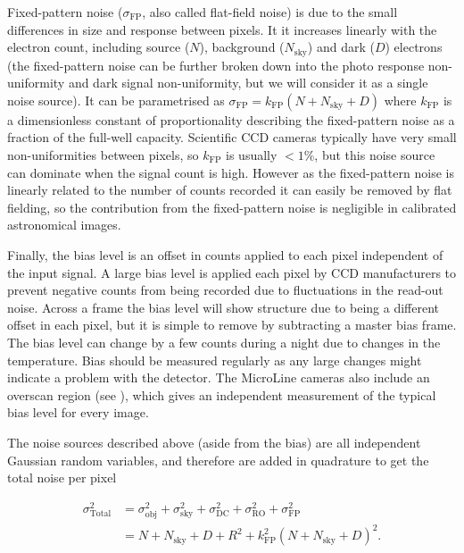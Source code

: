 \begin{colsection}
Fixed-pattern noise ($\sigma_\text{FP}$, also called flat-field noise) is due to the small differences in size and response between pixels. It it increases linearly with the electron count, including source ($N$), background ($N_\text{sky}$) and dark ($D$) electrons (the fixed-pattern noise can be further broken down into the photo response non-uniformity and dark signal non-uniformity, but we will consider it as a single noise source). It can be parametrised as $\sigma_\text{FP} = k_\text{FP}(N+N_\text{sky}+D)$ where $k_\text{FP}$ is a dimensionless constant of proportionality describing the fixed-pattern noise as a fraction of the full-well capacity. Scientific CCD cameras typically have very small non-uniformities between pixels, so $k_\text{FP}$ is usually $<1\%$, but this noise source can dominate when the signal count is high. However as the fixed-pattern noise is linearly related to the number of counts recorded  it can easily be removed by flat fielding, so the contribution from the fixed-pattern noise is negligible in calibrated astronomical images.

Finally, the bias level is an offset in counts applied to each pixel independent of the input signal. A large bias level is applied each pixel by CCD manufacturers to prevent negative counts from being recorded due to fluctuations in the read-out noise. Across a frame the bias level will show structure due to being a different offset in each pixel, but it is simple to remove by subtracting a master bias frame. The bias level can change by a few counts during a night due to changes in the temperature. Bias should be measured regularly as any large changes might indicate a problem with the detector. The MicroLine cameras also include an overscan region (see ), which gives an independent measurement of the typical bias level for every image.

The noise sources described above (aside from the bias) are all independent Gaussian random variables, and therefore are added in quadrature to get the total noise per pixel

\begin{equation}
    \begin{split}
        \sigma_\text{Total}^2 & = \sigma_\text{obj}^2 +
                                  \sigma_\text{sky}^2 +
                                  \sigma_\text{DC}^2 +
                                  \sigma_\text{RO}^2 +
                                  \sigma_\text{FP}^2 \\
                              & = N + N_\text{sky} + D + R^2 + k_\text{FP}^2{(N+N_\text{sky}+D)}^2.
    \end{split}
    \label{eq:noise}
\end{equation}

\end{colsection}


